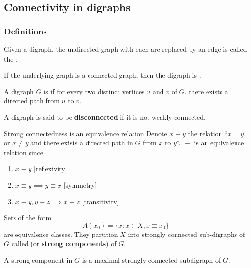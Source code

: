 \documentclass[aspectratio=169]{beamer}
\begin{document}
\subsection{Connectivity in digraphs}
\begin{frame}\frametitle{Definitions}

	\begin{definition}
	Given a digraph, the undirected graph with each arc replaced by an edge is called the .
	\end{definition}


	\begin{definition}
	If the underlying graph is a connected graph, then the digraph is .
	\end{definition}

	\begin{definition}
	A digraph $G$ is  if for every two distinct vertices $u$ and $v$ of $G$, there exists a directed path from $u$ to $v$.
	\end{definition}


	\begin{definition}
	A digraph is said to be \textbf{disconnected} if it is not weakly connected.
	\end{definition}
\end{frame}

\begin{frame}{Strong connectedness is an equivalence relation}
Denote $x\equiv y$ the relation  ``$x=y$, or $x\neq y$ and there exists a directed path in $G$ from $x$ to $y$''. $\equiv$ is an equivalence relation since
\begin{enumerate}
	\item $x\equiv y$ \hfill[reflexivity]
	\item $x\equiv y\implies y\equiv x$ \hfill[symmetry]
	\item $x\equiv y, y\equiv z\implies x\equiv z$ \hfill[transitivity]
\end{enumerate}
\begin{definition}
	\label{def:strong_components}
	Sets of the form 
	\[
	A(x_0)=\{x:x\in X, x\equiv x_0\}	
	\]
	are equivalence classes. 
	They partition $X$ into strongly connected sub-digraphs of $G$ called  (or \textbf{strong components}) of $G$.
\end{definition}
A strong component in $G$ is a maximal strongly connected subdigraph of $G$.
\end{frame}
\end{document}
